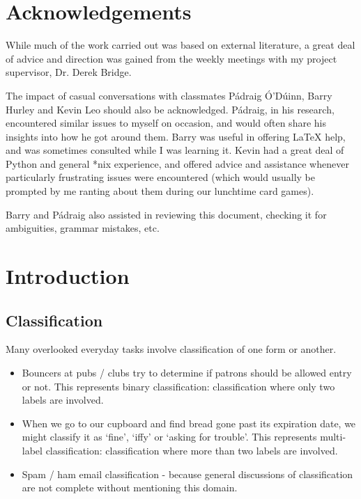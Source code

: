 \documentclass[a4paper,11pt]{report}
\begin{document}
\chapter*{Acknowledgements}
While much of the work carried out was based on external literature, a great deal of advice and direction was gained from the weekly meetings with my project supervisor, Dr. Derek Bridge.

The impact of casual conversations with classmates P\'{a}draig \'{O}'D\'uinn, Barry Hurley and Kevin Leo should also be acknowledged. P\'{a}draig, in his research, encountered similar issues to myself on occasion, and would often share his insights into how he got around them. Barry was useful in offering \LaTeX{} help, and was sometimes consulted while I was learning it. Kevin had a great deal of Python and general *nix experience, and offered advice and assistance whenever particularly frustrating issues were encountered (which would usually be prompted by me ranting about them during our lunchtime card games).

Barry and P\'{a}draig also assisted in reviewing this document, checking it for ambiguities, grammar mistakes, etc.

\tableofcontents

\chapter{Introduction}

\section{Classification}

Many overlooked everyday tasks involve classification of one form or another. 
\begin{itemize}
	\item Bouncers at pubs / clubs try to determine if patrons should be allowed entry or not. This represents binary classification: classification where only two labels are involved.
	\item When we go to our cupboard and find bread gone past its expiration date, we might classify it as `fine', `iffy' or `asking for trouble'. This represents multi-label classification: classification where more than two labels are involved.
	\item Spam / ham email classification - because general discussions of classification are not complete without mentioning this domain.
\end{itemize}
\end{document}
